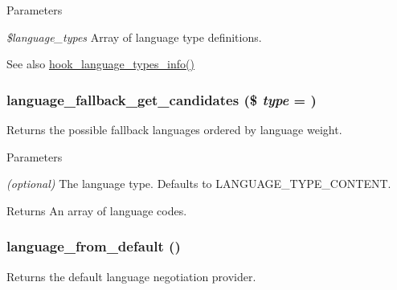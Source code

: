 \begin{DoxyParams}{Parameters}
\item[{\em \$language\_\-types}]Array of language type definitions.\end{DoxyParams}
\begin{DoxySeeAlso}{See also}
\hyperlink{group__language__negotiation_ga8932d2167557c18966cd033cfbe0f37e}{hook\_\-language\_\-types\_\-info()} 
\end{DoxySeeAlso}
\hypertarget{group__language__negotiation_gaaea53d7377445168a1e71bf982d59f11}{
\subsubsection[{language\_\-fallback\_\-get\_\-candidates}]{\setlength{\rightskip}{0pt plus 5cm}language\_\-fallback\_\-get\_\-candidates (\$ {\em type} = {})}}
\label{group__language__negotiation_gaaea53d7377445168a1e71bf982d59f11}
Returns the possible fallback languages ordered by language weight.


\begin{DoxyParams}{Parameters}
\item[{\em (optional)}]The language type. Defaults to LANGUAGE\_\-TYPE\_\-CONTENT.\end{DoxyParams}
\begin{DoxyReturn}{Returns}
An array of language codes. 
\end{DoxyReturn}
\hypertarget{group__language__negotiation_ga643666b0e37987d93ab75235bb7729b5}{
\subsubsection[{language\_\-from\_\-default}]{\setlength{\rightskip}{0pt plus 5cm}language\_\-from\_\-default ()}}
\label{group__language__negotiation_ga643666b0e37987d93ab75235bb7729b5}
Returns the default language negotiation provider.

